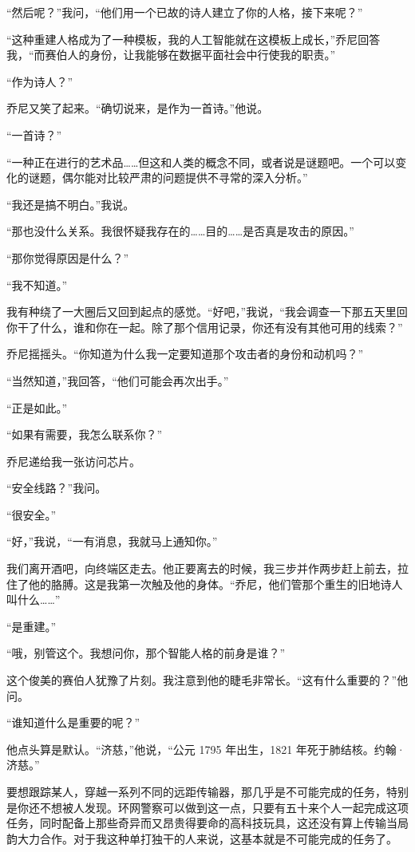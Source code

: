 \documentclass[AutoFakeBold=true]{book}
\begin{document}
``然后呢？''我问，``他们用一个已故的诗人建立了你的人格，接下来呢？''

``这种重建人格成为了一种模板，我的人工智能就在这模板上成长，''乔尼回答我，``而赛伯人的身份，让我能够在数据平面社会中行使我的职责。''

``作为诗人？''

乔尼又笑了起来。``确切说来，是作为一首诗。''他说。

``一首诗？''

``一种正在进行的艺术品……但这和人类的概念不同，或者说是谜题吧。一个可以变化的谜题，偶尔能对比较严肃的问题提供不寻常的深入分析。''

``我还是搞不明白。''我说。

``那也没什么关系。我很怀疑我存在的……目的……是否真是攻击的原因。''

``那你觉得原因是什么？''

``我不知道。''

我有种绕了一大圈后又回到起点的感觉。``好吧，''我说，``我会调查一下那五天里回你干了什么，谁和你在一起。除了那个信用记录，你还有没有其他可用的线索？''

乔尼摇摇头。``你知道为什么我一定要知道那个攻击者的身份和动机吗？''

``当然知道，''我回答，``他们可能会再次出手。''

``正是如此。''

``如果有需要，我怎么联系你？''

乔尼递给我一张访问芯片。

``安全线路？''我问。

``很安全。''

``好，''我说，``一有消息，我就马上通知你。''

我们离开酒吧，向终端区走去。他正要离去的时候，我三步并作两步赶上前去，拉住了他的胳膊。这是我第一次触及他的身体。``乔尼，他们管那个重生的旧地诗人叫什么……''

``是重建。''

``哦，别管这个。我想问你，那个智能人格的前身是谁？''

这个俊美的赛伯人犹豫了片刻。我注意到他的睫毛非常长。``这有什么重要的？''他问。

``谁知道什么是重要的呢？''

他点头算是默认。``济慈，''他说，``公元 1795 年出生，1821 年死于肺结核。约翰·济慈。''

\vspace*{1em}

要想跟踪某人，穿越一系列不同的远距传输器，那几乎是不可能完成的任务，特别是你还不想被人发现。环网警察可以做到这一点，只要有五十来个人一起完成这项任务，同时配备上那些奇异而又昂贵得要命的高科技玩具，这还没有算上传输当局韵大力合作。对于我这种单打独干的人来说，这基本就是不可能完成的任务了。
\end{document}

